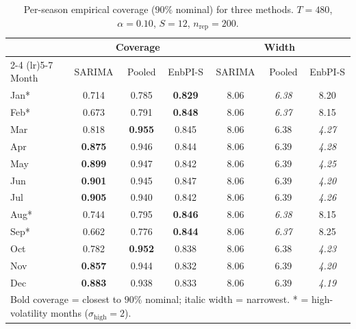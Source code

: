 \begin{table}[ht]
\centering
\small
\caption{Per-season empirical coverage ($90\%$ nominal) for three methods.
$T=480$, $\alpha=0.10$, $S=12$, $n_{\mathrm{rep}}=200$.}
\label{tab:e1_three_methods_T480}
{\setlength{\tabcolsep}{5pt}
\begin{tabular}{l ccc @{\hspace{0.8em}} ccc}
\toprule
 & \multicolumn{3}{c}{Coverage} & \multicolumn{3}{c}{Width} \\
\cmidrule(lr){2-4} \cmidrule(lr){5-7}
Month & SARIMA & Pooled & EnbPI-S & SARIMA & Pooled & EnbPI-S \\
\midrule
Jan* & 0.714 & 0.785 & \textbf{0.829} & 8.06 & \textit{6.38} & 8.20 \\
Feb* & 0.673 & 0.791 & \textbf{0.848} & 8.06 & \textit{6.37} & 8.15 \\
Mar & 0.818 & \textbf{0.955} & 0.845 & 8.06 & 6.38 & \textit{4.27} \\
Apr & \textbf{0.875} & 0.946 & 0.844 & 8.06 & 6.39 & \textit{4.28} \\
May & \textbf{0.899} & 0.947 & 0.842 & 8.06 & 6.39 & \textit{4.25} \\
Jun & \textbf{0.901} & 0.945 & 0.847 & 8.06 & 6.39 & \textit{4.20} \\
Jul & \textbf{0.905} & 0.940 & 0.842 & 8.06 & 6.39 & \textit{4.26} \\
Aug* & 0.744 & 0.795 & \textbf{0.846} & 8.06 & \textit{6.38} & 8.15 \\
Sep* & 0.662 & 0.776 & \textbf{0.844} & 8.06 & \textit{6.37} & 8.25 \\
Oct & 0.782 & \textbf{0.952} & 0.838 & 8.06 & 6.38 & \textit{4.23} \\
Nov & \textbf{0.857} & 0.944 & 0.832 & 8.06 & 6.39 & \textit{4.20} \\
Dec & \textbf{0.883} & 0.938 & 0.833 & 8.06 & 6.39 & \textit{4.19} \\
\bottomrule
\multicolumn{7}{l}{\footnotesize Bold coverage = closest to $90\%$ nominal; italic width = narrowest.  * = high-volatility months ($\sigma_{\mathrm{high}}=2$).} \\
\end{tabular}}
\end{table}